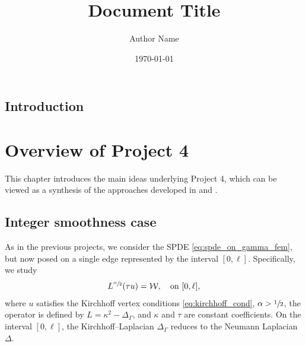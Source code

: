 \documentclass[11pt,a4paper]{article}
\title{Document Title}
\author{Author Name}
\date{\today}
\theoremstyle{plain}
\theoremstyle{definition}
\begin{document}
\maketitle

\section{Introduction}



\chapter{Overview of Project 4}
\label{chapter7}
\thispagestyle{empty}

This chapter introduces the main ideas underlying Project 4, which can be viewed as a synthesis of the approaches developed in \cite{Bolin2023Statistical} and \cite{Bolin2025Linear}.

\section{Integer smoothness case}
\label{sec:integer_smoothness_case}
As in the previous projects, we consider the SPDE \eqref{eq:spde_on_gamma_fem}, but now posed on a single edge represented by the interval $[0,\ell]$. Specifically, we study
\begin{align}
\label{eq:spde_on_interval}
L^{\sfrac{\alpha}{2}} (\tau u) = \mathcal{W}, \quad \text{on } [0,\ell],
\end{align}
where $u$ satisfies the Kirchhoff vertex conditions \eqref{eq:kirchhoff_cond}, $\alpha > \sfrac{1}{2}$, the operator is defined by $L = \kappa^2 - \Delta_{\Gamma}$, and $\kappa$ and $\tau$ are constant coefficients. On the interval $[0,\ell]$, the Kirchhoff--Laplacian $\Delta_{\Gamma}$ reduces to the Neumann Laplacian $\Delta$.
\end{document}
